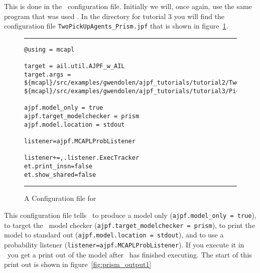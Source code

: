 This is done in the \ajpf\ configuration file.  Initially we will, once again, use the same program that was used .  In the directory for tutorial 3 you will find the configuration file \texttt{TwoPickUpAgents\_Prism.jpf} that is shown in figure~\ref{fig:prism_config1}.

\begin{figure}[htb]
\noindent\rule{\textwidth}{1pt}
\begin{small}
\begin{verbatim}
@using = mcapl

target = ail.util.AJPF_w_AIL
target.args = ${mcapl}/src/examples/gwendolen/ajpf_tutorials/tutorial2/TwoPickUpAgents.ail,
${mcapl}/src/examples/gwendolen/ajpf_tutorials/tutorial3/PickUpAgent.psl,1

ajpf.model_only = true
ajpf.target_modelchecker = prism
ajpf.model.location = stdout

listener=ajpf.MCAPLProbListener

listener+=,.listener.ExecTracker
et.print_insn=false
et.show_shared=false
\end{verbatim}
\end{small}
\rule{\textwidth}{1pt}
\caption{A Configuration file for \prism}
\label{fig:prism_config1}
\end{figure}

This configuration file tells \ajpf\ to produce a model only (\texttt{ajpf.model\_only = true}), to target the \prism\ model checker (\texttt{ajpf.target\_modelchecker = prism}), to print the model to standard out (\texttt{ajpf.model.location = stdout}), and to use a probability listener (\texttt{listener=ajpf.MCAPLProbListener}).  If you execute it in \ajpf\ you get a print out of the model after \ajpf\  has finished executing.  The start of this print out is shown in figure~\ref{fig:prism_output1}

